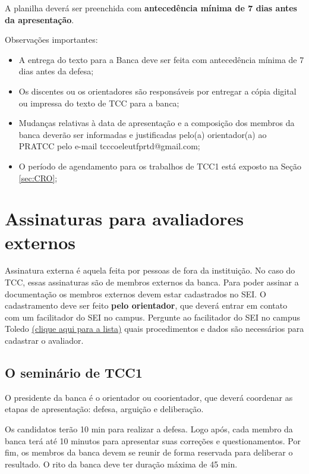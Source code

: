 \documentclass[a4paper, 12pt]{article}
\begin{document}
    A planilha deverá ser preenchida com \textbf{antecedência mínima de 7 dias antes da apresentação}.    
		
    Observações importantes:
    
    \begin{itemize}
    	\item A entrega do texto para a Banca deve ser feita com antecedência mínima de 7 dias antes da defesa;
    	\item Os discentes ou os orientadores são responsáveis por entregar a cópia digital ou impressa do texto de TCC para a banca;
    	\item Mudanças relativas à data de apresentação e a composição dos membros da banca deverão ser informadas e justificadas pelo(a) orientador(a) ao PRATCC pelo e-mail tcccoeleutfprtd@gmail.com;
    	\item O período de agendamento para os trabalhos de TCC1 está exposto na Seção \ref{sec:CRO};
    \end{itemize}

	\section{Assinaturas para avaliadores externos}
	
	Assinatura externa é aquela feita por pessoas de fora da instituição. No caso do TCC, essas assinaturas são de membros externos da banca. Para poder assinar a documentação os membros externos devem estar cadastrados no SEI. O cadastramento deve ser feito \textbf{pelo orientador}, que deverá entrar em contato com um facilitador do SEI no campus. Pergunte ao facilitador do SEI no campus Toledo \href{http://portal.utfpr.edu.br/servidores/servicos-servidor/sei/facilitadores}{(clique aqui para a lista)} quais procedimentos e dados são necessários para cadastrar o avaliador.

	\subsection{O seminário de TCC1}
	
	O presidente da banca é o orientador ou coorientador, que deverá coordenar as etapas de apresentação: defesa, arguição e deliberação. 
	
	Os candidatos terão 10 min para realizar a defesa. Logo após, cada membro da banca terá até 10 minutos para apresentar suas correções e questionamentos. Por fim, os membros da banca devem se reunir de forma reservada para deliberar o resultado. O rito da banca deve ter duração máxima de 45 min.	
\end{document}
